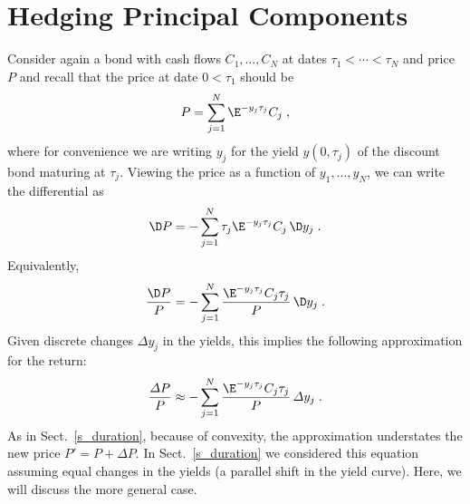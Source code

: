 \section{Hedging Principal Components}\label{s_hedgingprincipalcomponents}

Consider again  a bond with cash flows $C_1, \ldots, C_N$ at dates $\tau_1 < \cdots < \tau_N$ and price $P$ and recall that the price at date $0 < \tau_1$ should be
$$P = \sum_{j=1}^{N} \E^{-y_j\tau_{j}}C_{j}\; ,$$
where for convenience we are writing $y_j$ for the yield $y(0,\tau_j)$ of the discount bond maturing at $\tau_j$.  Viewing the price as a function of $y_1, \ldots, y_N$, we can write the differential as
$$\D P = -\sum_{j=1}^{N} \tau_j\E^{-y_j\tau_{j}}C_{j}\, \D y_j\; .$$
Equivalently,
$$\frac{\D P}{P} = -\sum_{j=1}^{N} \frac{\E^{-y_j\tau_{j}}C_{j}\tau_j}{P}\, \D y_j\; .$$
Given discrete changes $\varDelta y_j$ in the yields, this implies the following approximation for the return:
\begin{equation}\label{durationreturn11}
\frac{\varDelta P}{P} \approx -\sum_{j=1}^{N} \frac{\E^{-y_j\tau_{j}}C_{j}\tau_j}{P}\, \varDelta y_j\;.
\end{equation}
As in Sect.~\ref{s_duration}, because of convexity, the approximation understates the new price $P' = P + \varDelta P$.  In Sect.~\ref{s_duration} we considered this equation assuming equal changes in the yields (a parallel shift in the yield curve).  Here, we will discuss the more general case.



